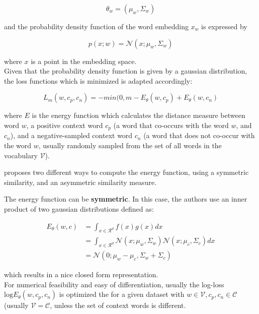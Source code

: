 \documentclass[a4paper,12pt,twoside,openright]{report}
\begin{document}
$$
\theta_w = ( \mu_w,  \Sigma_w)
$$

and the probability density function of the word embedding $x_w$ is expressed by

\begin{equation}
p(x; w) = \mathcal{N}\left(x ; \mu_{w}, \Sigma_{w}\right)
\end{equation}

where $x$ is a point in the embedding space. \\

Given that the probability density function is given by a gaussian distribution, the loss functions which is minimized is adapted accordingly:

\begin{equation}
L_m(w, c_p, c_n) = - min(0, m - E_\theta(w, c_p) + E_\theta(w, c_n)
\end{equation}

where $E$ is the energy function which calculates the distance measure between word $w$, a positive context word $c_p$ (a word that co-occurs with the word $w$, and $c_n$), and a negative-sampled context word $c_n$ (a word that does not co-occur with the word $w$, usually randomly sampled from the set of all words in the vocabulary $\mathcal{V}$).

\cite{vilnis14} proposes two different ways to compute the energy function, using a symmetric similarity, and an asymmetric similarity measure.



The energy function can be \textbf{symmetric}.
In this case, the authors use an inner product of two gaussian distributions defined as:

\begin{align}
E_\theta(w, c) &= \int_{x \in \mathcal{R}^d} f(x)g(x) dx \\
&= \int_{x \in \mathcal{R}^d} \mathcal{N}(x; \mu_w, \Sigma_w) \mathcal{N}(x; \mu_c, \Sigma_c) dx \\
&= \mathcal{N}(0; \mu_w - \mu_c, \Sigma_w + \Sigma_c)
\end{align}

which results in a nice closed form representation. \\

For numerical feasibility and easy of differentiation, usually the log-loss $\text{log} E_\theta(w, c_p, c_n)$ is optimized the for a given dataset with $w \in \mathcal{V}, c_p, c_n \in \mathcal{C}$ (usually $\mathcal{V} = \mathcal{C}$, unless the set of context words is different.
\end{document}
